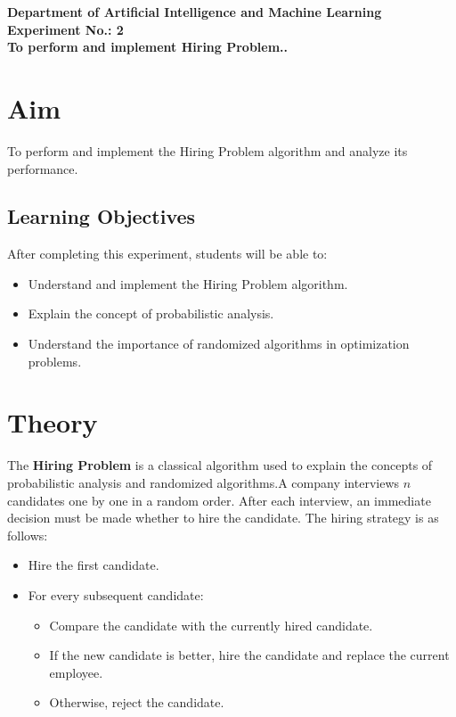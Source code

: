 \documentclass[12pt,a4paper]{article}
\begin{document}
\begin{center} 
    \large \textbf{Department of Artificial Intelligence and Machine Learning}\\
    \Large \textbf{Experiment No.: 2} \\
    \large \textbf{To perform and implement Hiring Problem..}
\end{center}

\section*{Aim}
To perform and implement the Hiring Problem algorithm and analyze its performance.

\subsection*{Learning Objectives}

After completing this experiment, students will be able to:

\begin{itemize}
    \item Understand and implement the Hiring Problem algorithm.
    \item Explain the concept of probabilistic analysis.
    \item Understand the importance of randomized algorithms in optimization problems.
\end{itemize}
\section*{Theory}

The \textbf{Hiring Problem} is a classical algorithm used to explain the concepts of probabilistic analysis and randomized algorithms.A company interviews $n$ candidates one by one in a random order. After each interview, an immediate decision must be made whether to hire the candidate. The hiring strategy is as follows:

\begin{itemize}
    \item Hire the first candidate.
    \item For every subsequent candidate:
    \begin{itemize}
        \item Compare the candidate with the currently hired candidate.
        \item If the new candidate is better, hire the candidate and replace the current employee.
        \item Otherwise, reject the candidate.
    \end{itemize}
\end{itemize}
\end{document}
